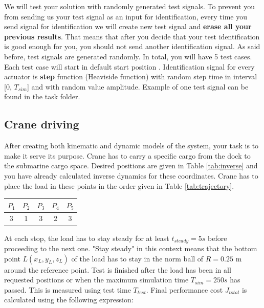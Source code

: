 \documentclass{article}
\begin{document}
	We will test your solution with randomly generated test signals. To prevent you from sending us your test signal as an input for identification, every time you send signal for identification we will create new test signal and \textbf{erase all your previous results}. That means that after you decide that your test identification is good enough for you, you should not send another identification signal.
	As said before, test signals are generated randomly. In total, you will have 5 test cases.  Each test case will start in default start position . 
	Identification signal for every actuator is \textbf{step} function  (Heaviside function) with random step time in interval [0, $T_{sim}$] and with random value amplitude. Example of one test signal can be found in the task folder.
	
	\subsection{Crane driving}
	
	After creating both kinematic and dynamic models of the system, your task is to make it serve its purpose. Crane has to carry a specific cargo from the dock to the submarine cargo space. Desired positions are given in Table \ref{tab:inverse} and you have already calculated inverse dynamics for these coordinates. Crane has to place the load in these points in the order given in Table \ref{tab:trajectory}.
	
	\begin{center}
		\label{tab:trajectory}
		\begin{tabular}{|| c c c c c ||}
			\hline
			$P_1$ & $P_2$ & $P_3$ & $P_4$ & $P_5$\\
			\hline\hline
			3 & 1 & 3 & 2 & 3  \\ 
			\hline
		\end{tabular}
	\end{center}
	
	\noindent
	At each stop, the load has to stay steady for at least $t_{steady} = 5s$ before proceeding to the next one. "Stay steady" in this context means that the bottom point $L(x_L,y_L,z_L)$ of the load has to stay in the norm ball of $R = 0.25$ m around the reference point. Test is finished after the load has been in all requested positions or when the maximum simulation time $T_{sim} = 250s$ has passed. This is measured using test time $T_{test}$. Final performance cost $J_{total}$ is calculated using the following expression:
	
\end{document}
